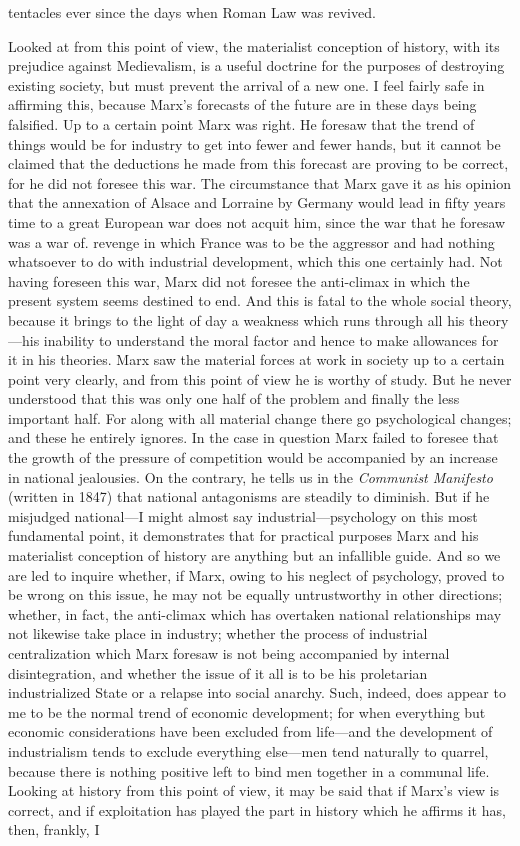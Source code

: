 \documentclass{book}
\begin{document}
tentacles ever since the days when Roman Law was revived.

Looked at from this point of view, the materialist conception of history, with its prejudice against Medievalism, is a useful doctrine for the purposes of destroying existing society, but must prevent the arrival of a new one. I feel fairly safe in affirming this, because Marx’s forecasts of the future are in these days being falsified. Up to a certain point Marx was right. He foresaw that the trend of things would be for industry to get into fewer and fewer hands, but it cannot be claimed that the deductions he made from this forecast are proving to be correct, for he did not foresee this war. The circumstance that Marx gave it as his opinion that the annexation of Alsace and Lorraine by Germany would lead in fifty years time to a great European war does not acquit him, since the war that he foresaw was a war of. revenge in which France was to be the aggressor and had nothing whatsoever to do with industrial development, which this one certainly had. Not having foreseen this war, Marx did not foresee the anti-climax in which the present system seems destined to end. And this is fatal to the whole social theory, because it brings to the light of day a weakness which runs through all his theory—his inability to understand the moral factor and hence to make allowances for it in his theories. Marx saw the material forces at work in society up to a certain point very clearly, and from this point of view he is worthy of study. But he never understood that this was only one half of the problem and finally the less important half. For along with all material change there go psychological changes; and these he entirely ignores. In the case in question Marx failed to foresee that the growth of the pressure of competition would be accompanied by an increase in national jealousies. On the contrary, he tells us in the \emph{Communist Manifesto} (written in 1847) that national antagonisms are steadily to diminish. But if he misjudged national—I might almost say industrial—psychology on this most fundamental point, it demonstrates that for practical purposes Marx and his materialist conception of history are anything but an infallible guide. And so we are led to inquire whether, if Marx, owing to his neglect of psychology, proved to be wrong on this issue, he may not be equally untrustworthy in other directions; whether, in fact, the anti-climax which has overtaken national relationships may not likewise take place in industry; whether the process of industrial centralization which Marx foresaw is not being accompanied by internal disintegration, and whether the issue of it all is to be his proletarian industrialized State or a relapse into social anarchy. Such, indeed, does appear to me to be the normal trend of economic development; for when everything but economic considerations have been excluded from life—and the development of industrialism tends to exclude everything else—men tend naturally to quarrel, because there is nothing positive left to bind men together in a communal life. Looking at history from this point of view, it may be said that if Marx’s view is correct, and if exploitation has played the part in history which he affirms it has, then, frankly, I 
\end{document}
